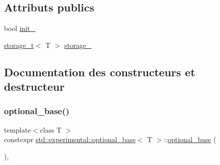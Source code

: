 \subsection*{Attributs publics}
\begin{DoxyCompactItemize}
\item 
bool \hyperlink{structstd_1_1experimental_1_1optional__base_aa0df221e8ebf3abc45c0e78d0b963c01}{init\+\_\+}
\item 
\hyperlink{unionstd_1_1experimental_1_1storage__t}{storage\+\_\+t}$<$ T $>$ \hyperlink{structstd_1_1experimental_1_1optional__base_aa7f2be708eddd8066eee64ef852e4314}{storage\+\_\+}
\end{DoxyCompactItemize}


\subsection{Documentation des constructeurs et destructeur}
\mbox{\label{structstd_1_1experimental_1_1optional__base_a31134784c4c482947d66c600fe0dcad4}} 
\subsubsection{\texorpdfstring{optional\+\_\+base()}{optional\_base()}\hspace{0.1cm}{\footnotesize\ttfamily [1/5]}}
{\footnotesize\ttfamily template$<$class T $>$ \\
constexpr \hyperlink{structstd_1_1experimental_1_1optional__base}{std\+::experimental\+::optional\+\_\+base}$<$ T $>$\+::\hyperlink{structstd_1_1experimental_1_1optional__base}{optional\+\_\+base} (\begin{DoxyParamCaption}{ }\end{DoxyParamCaption})\hspace{0.3cm}{\ttfamily [inline]}, {\ttfamily [noexcept]}}

\mbox{\label{structstd_1_1experimental_1_1optional__base_af47cc844bf9d32ad4361be9934c20939}} 
